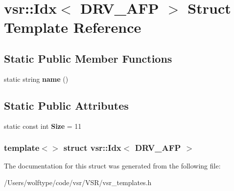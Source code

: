 \hypertarget{structvsr_1_1_idx_3_01_d_r_v___a_f_p_01_4}{\section{vsr\-:\-:Idx$<$ D\-R\-V\-\_\-\-A\-F\-P $>$ Struct Template Reference}
\label{structvsr_1_1_idx_3_01_d_r_v___a_f_p_01_4}
}
\subsection*{Static Public Member Functions}
\begin{DoxyCompactItemize}
\item 
\hypertarget{structvsr_1_1_idx_3_01_d_r_v___a_f_p_01_4_a75dafb79de6b02104c7f6e5fb532f1df}{static string {\bfseries name} ()}\label{structvsr_1_1_idx_3_01_d_r_v___a_f_p_01_4_a75dafb79de6b02104c7f6e5fb532f1df}

\end{DoxyCompactItemize}
\subsection*{Static Public Attributes}
\begin{DoxyCompactItemize}
\item 
\hypertarget{structvsr_1_1_idx_3_01_d_r_v___a_f_p_01_4_aaae17ab4a7a0091acd367e744dc92813}{static const int {\bfseries Size} = 11}\label{structvsr_1_1_idx_3_01_d_r_v___a_f_p_01_4_aaae17ab4a7a0091acd367e744dc92813}

\end{DoxyCompactItemize}
\subsubsection*{template$<$$>$ struct vsr\-::\-Idx$<$ D\-R\-V\-\_\-\-A\-F\-P $>$}



The documentation for this struct was generated from the following file\-:\begin{DoxyCompactItemize}
\item 
/\-Users/wolftype/code/vsr/\-V\-S\-R/vsr\-\_\-templates.\-h\end{DoxyCompactItemize}
